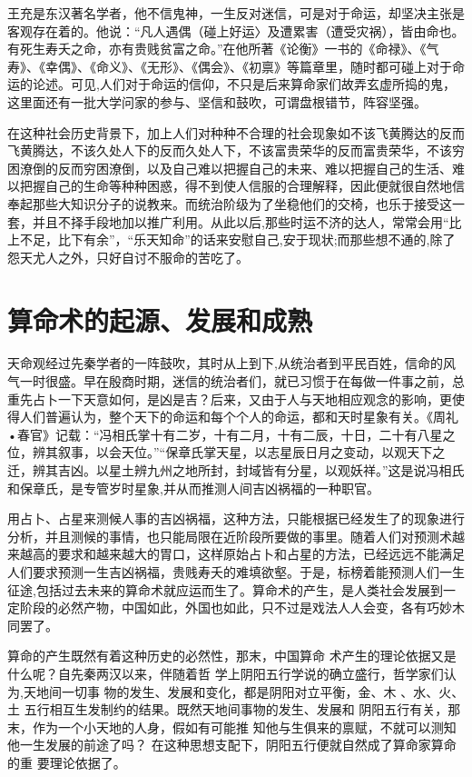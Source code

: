 王充是东汉著名学者，他不信鬼神，一生反对迷信，可是对于命运，却坚决主张是客观存在着的。他说：“凡人遇偶（碰上好运〉及遭累害（遭受灾祸），皆由命也。有死生寿夭之命，亦有贵贱贫富之命。”在他所著《论衡》一书的《命禄》、《气寿》、《幸偶》、《命义》、《无形》、《偶会》、《初禀》等篇章里，随时都可碰上对于命运的论述。可见,人们对于命运的信仰，不只是后来算命家们故弄玄虚所捣的鬼，这里面还有一批大学问家的参与、坚信和鼓吹，可谓盘根错节，阵容坚强。

在这种社会历史背景下，加上人们对种种不合理的社会现象如不该飞黄腾达的反而飞黄腾达，不该久处人下的反而久处人下，不该富贵荣华的反而富贵荣华，不该穷困潦倒的反而穷困潦倒，以及自己难以把握自己的未来、难以把握自己的生活、难以把握自己的生命等种种困惑，得不到使人信服的合理解释，因此便就很自然地信奉起那些大知识分子的说教来。而统治阶级为了坐稳他们的交椅，也乐于接受这一套，并且不择手段地加以推广利用。从此以后,那些时运不济的达人，常常会用“比上不足，比下有余”，“乐天知命”的话来安慰自己,安于现状;而那些想不通的,除了怨天尤人之外，只好自讨不服命的苦吃了。

\section{算命术的起源、发展和成熟}
天命观经过先秦学者的一阵鼓吹，其时从上到下,从统治者到平民百姓，信命的风气一时很盛。早在殷商时期，迷信的统治者们，就已习惯于在每做一件事之前，总重先占卜一下天意如何，是凶是吉？后来，又由于人与天地相应观念的影响，更使得人们普遍认为，整个天下的命运和每个个人的命运，都和天时星象有关。《周礼 •春官》记载：“冯相氏掌十有二岁，十有二月，十有二辰，十日，二十有八星之位，辨其叙事，以会天位。”“保章氏掌天星，以志星辰日月之变动，以观天下之迁，辨其吉凶。以星土辨九州之地所封，封域皆有分星，以观妖祥。”这是说冯相氏和保章氏，是专管岁时星象,并从而推测人间吉凶祸福的一种职官。

用占卜、占星来测候人事的吉凶祸福，这种方法，只能根据已经发生了的现象进行分析，并且测候的事情，也只能局限在近阶段所要做的事里。随着人们对预测术越来越高的要求和越来越大的胃口，这样原始占卜和占星的方法，已经远远不能满足人们要求预测一生吉凶祸福，贵贱寿夭的难填欲壑。于是，标榜着能预测人们一生征途,包括过去未来的算命术就应运而生了。算命术的产生，是人类社会发展到一定阶段的必然产物，中国如此，外国也如此，只不过是戏法人人会变，各有巧妙木同罢了。

算命的产生既然有着这种历史的必然性，那末，中国算命
术产生的理论依据又是什么呢？自先秦两汉以来，伴随着哲
学上阴阳五行学说的确立盛行，哲学家们认为,天地间一切事
物的发生、发展和变化，都是阴阳对立平衡，金、木 、水、火、土
五行相互生发制约的结果。既然天地间事物的发生、发展和
阴阳五行有关，那末，作为一个小天地的人身，假如有可能推
知他与生俱来的禀赋，不就可以测知他一生发展的前途了吗？
在这种思想支配下，阴阳五行便就自然成了算命家算命的重
要理论依据了。

